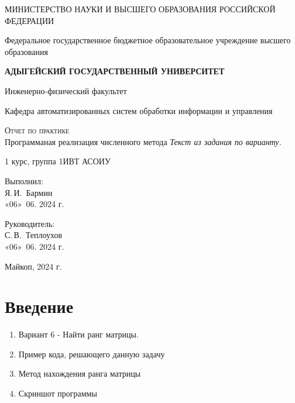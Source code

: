 \documentclass{article}
\begin{document}
  \begin{titlepage}
    \begin{center}
      \large
      МИНИСТЕРСТВО НАУКИ И ВЫСШЕГО ОБРАЗОВАНИЯ РОССИЙСКОЙ ФЕДЕРАЦИИ
      
      Федеральное государственное бюджетное образовательное учреждение высшего образования
      
      \textbf{АДЫГЕЙСКИЙ ГОСУДАРСТВЕННЫЙ УНИВЕРСИТЕТ}
      \vspace{0.25cm}
      
      Инженерно-физический факультет
      
      Кафедра автоматизированных систем обработки информации и управления
      \vfill

      \vfill
      
      \textsc{Отчет по практике}\\[5mm]
      
      {\LARGE Программаная реализация численного метода \textit{Текст из задания по варианту.}}
      \bigskip
      
      1 курс, группа 1ИВТ АСОИУ
    \end{center}
    \vfill
    
    \newlength{\ML}
    \hfill\begin{minipage}{0.5\textwidth}
      Выполнил:\\
      \underline{\hspace{\ML}}Я.\,И.~Бармин\\
      «06» \,06. 2024 г.
    \end{minipage}%
    \bigskip
    
    \hfill\begin{minipage}{0.5\textwidth}
      Руководитель:\\
      \underline{\hspace{\ML}} С.\,В.~Теплоухов\\
      «06» \,06. 2024 г.
    \end{minipage}%
    \vfill
    
    \begin{center}
      Майкоп, 2024 г.
    \end{center}
  \end{titlepage}
 \section{Введение}
\label{sec:intro}
\begin{enumerate}
 \item Вариант 6 - Найти ранг матрицы.
 \item Пример кода, решающего данную задачу
 \item Метод нахождения ранга матрицы
 \item Скриншот программы
\end{enumerate}
\end{document}
